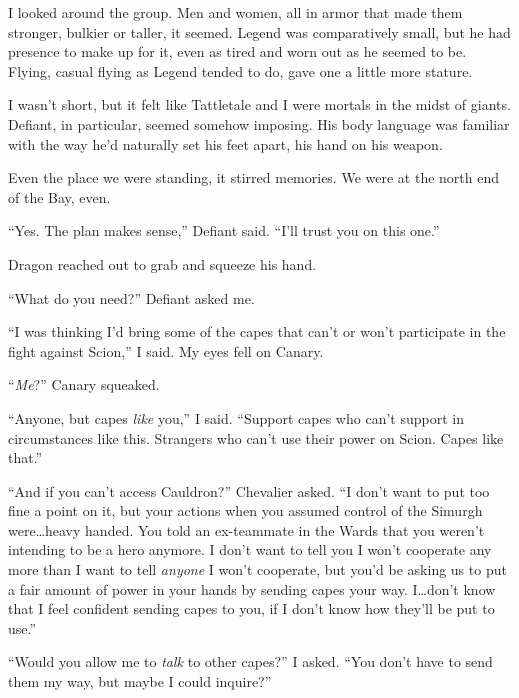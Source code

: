 I looked around the group.  Men and women, all in armor that made them stronger, bulkier or taller, it seemed.  Legend was comparatively small, but he had presence to make up for it, even as tired and worn out as he seemed to be.  Flying, casual flying as Legend tended to do, gave one a little more stature.



I wasn't short, but it felt like Tattletale and I were mortals in the midst of giants.  Defiant, in particular, seemed somehow imposing.  His body language was familiar with the way he'd naturally set his feet apart, his hand on his weapon.



Even the place we were standing, it stirred memories.  We were at the north end of the Bay, even.



``Yes.  The plan makes sense,'' Defiant said.  ``I'll trust you on this one.''



Dragon reached out to grab and squeeze his hand.



``What do you need?'' Defiant asked me.



``I was thinking I'd bring some of the capes that can't or won't participate in the fight against Scion,'' I said.  My eyes fell on Canary.



``\emph{Me}?''  Canary squeaked.



``Anyone, but capes \emph{like} you,'' I said.  ``Support capes who can't support in circumstances like this.  Strangers who can't use their power on Scion.  Capes like that.''



``And if you can't access Cauldron?'' Chevalier asked.  ``I don't want to put too fine a point on it, but your actions when you assumed control of the Simurgh were\ldots heavy handed.  You told an ex-teammate in the Wards that you weren't intending to be a hero anymore.  I don't want to tell you I won't cooperate any more than I want to tell \emph{anyone }I won't cooperate, but you'd be asking us to put a fair amount of power in your hands by sending capes your way.  I\ldots don't know that I feel confident sending capes to you, if I don't know how they'll be put to use.''



``Would you allow me to \emph{talk} to other capes?'' I asked.  ``You don't have to send them my way, but maybe I could inquire?''



